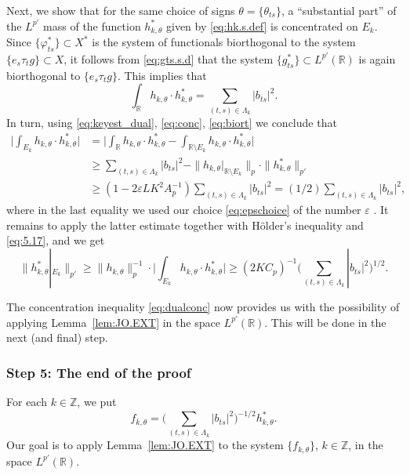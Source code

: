 \documentclass[reqno,a4paper,12pt]{amsart}
\numberwithin{equation}{section}
\numberwithin{figure}{section}
\newcommand\R{\mathbb{R}}
\newcommand\Z{\mathbb{Z}}
\newcommand\1{\mathds{1}}
\newcommand\eps{\varepsilon}
\newcommand{\pphi}{\varphi}
\renewcommand\ge{\geqslant}
\newcommand\sbt{\subset}
\theoremstyle{plain}
\newcommand{\lemref}[1]{Lemma~\ref{#1}}
\theoremstyle{definition}
\begin{document}
Next, we show that for the same choice of   signs 
$\theta = \{ \theta_{ts} \}$,  a ``substantial part''   
of the $L^{p'}$ mass of the function 
$h_{k,\theta}^*$ given by \eqref{eq:hk.s.def}
 is concentrated on $E_k$.
Since $\{\pphi_{ts}^*\} \sbt X^*$ is the
system of functionals biortho\-gonal to the system 
$\{e_s\tau_t g\} \sbt X$, it follows from \eqref{eq:gts.s.d}
that the system $\{ g_{ts}^* \} \sbt L^{p'}(\R)$ is again biorthogonal to $\{e_s\tau_t g\}$. 
This implies that
\begin{equation}
\label{eq:biort}
\int_\R h_{k,\theta}\cdot h^*_{k,\theta} = \sum_{(t,s)\in\Lambda_k} |b_{ts}|^2.
\end{equation}
In turn, using \eqref{eq:keyest_dual}, \eqref{eq:conc}, \eqref{eq:biort} we conclude that 
\begin{align}
 \Big| \int_{E_k} h_{k,\theta}\cdot h^*_{k,\theta}\Big| 
& =  \Big|\int_{\R} h_{k,\theta}\cdot h^*_{k,\theta} -\int_{\R\setminus E_k} h_{k,\theta}\cdot h^*_{k,\theta}\Big| \\
& \ge \sum_{(t,s)\in\Lambda_k} |b_{ts}|^2 -\|h_{k,\theta}|_{\R\setminus E_k}\|_p\cdot \|h^*_{k,\theta}\|_{p'}\\
& \ge    ( 1- 2 \eps L K^2  A_p^{-1}  )
\sum_{(t,s)\in\Lambda_k} |b_{ts}|^2 
= (1/2) \sum_{(t,s)\in\Lambda_k} |b_{ts}|^2, \label{eq:hhs.eq}
\end{align}
where in  the last equality  we used our choice \eqref{eq:epschoice}
of the number $\eps$ . It remains to apply the latter estimate
together with  H\"{o}lder's inequality and \eqref{eq:5.17}, and we get
\begin{equation}
\label{eq:dualconc}
\|h^*_{k,\theta}|_{E_k}\|_{p'} 
 \ge \|h_{k,\theta}\|_p^{-1}\cdot \Big| \int_{E_k} h_{k,\theta}\cdot h^*_{k,\theta}\Big|
 \ge (2KC_p)^{-1} \Big(\sum_{(t,s)\in\Lambda_k} |b_{ts}|^2\Big)^{1/2}.
\end{equation}

The concentration inequality \eqref{eq:dualconc} now provides us with the possibility of applying
\lemref{lem:JO.EXT} in the space $L^{p'}(\R)$. This will be done in the next (and final) step.


\subsubsection{Step 5: The end of the proof}  
For each $k \in \Z$, we put 
\begin{equation}
\label{eq:fk.def}
f_{k,\theta} = \Big(\sum_{(t,s)\in\Lambda_k} |b_{ts}|^2\Big)^{-1/2} h_{k,\theta}^*.
\end{equation}
Our goal is to apply \lemref{lem:JO.EXT} to the system 
$\{ f_{k,\theta} \}$, $k \in \Z$,  in the space $L^{p'}(\R)$.
\end{document}
